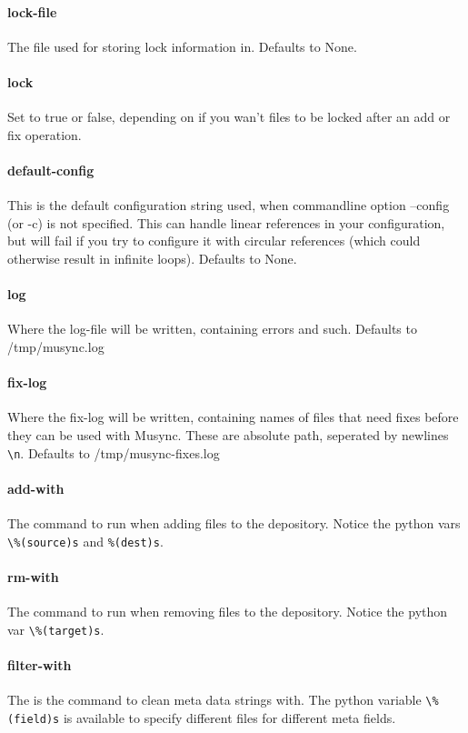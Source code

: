 \paragraph{lock-file}
The file used for storing lock information in. Defaults to None. 

\paragraph{lock}
Set to true or false, depending on if you wan't files to be locked after an add or fix operation. 

\paragraph{default-config}
This is the default configuration string used, when commandline option --config (or -c) is not specified.
This can handle linear references in your configuration, but will fail if you try to configure it with circular references (which could otherwise result in infinite loops). Defaults to None. 

\paragraph{log}
Where the log-file will be written, containing errors and such. Defaults to /tmp/musync.log 

\paragraph{fix-log}
Where the fix-log will be written, containing names of files that need fixes before they can be used with Musync.
These are absolute path, seperated by newlines \verb!\n!. Defaults to /tmp/musync-fixes.log 

\paragraph{add-with}
The command to run when adding files to the depository. Notice the python vars \verb!\%(source)s! and \verb!%(dest)s!. 

\paragraph{rm-with}
The command to run when removing files to the depository. Notice the python var \verb!\%(target)s!. 

\paragraph{filter-with}
The is the command to clean meta data strings with.
The python variable \verb!\%(field)s! is available to specify different files for different meta fields.

